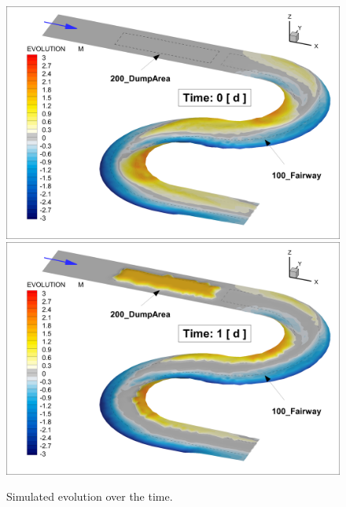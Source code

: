 \begin{figure} [!h]
\centering
\includegraphics[scale=0.14]{img/critDig_Poly_00p0d.png}
\includegraphics[scale=0.14]{img/critDig_Poly_01p0d.png}
\caption{Simulated evolution over the time.}\label{result12}
\end{figure}

